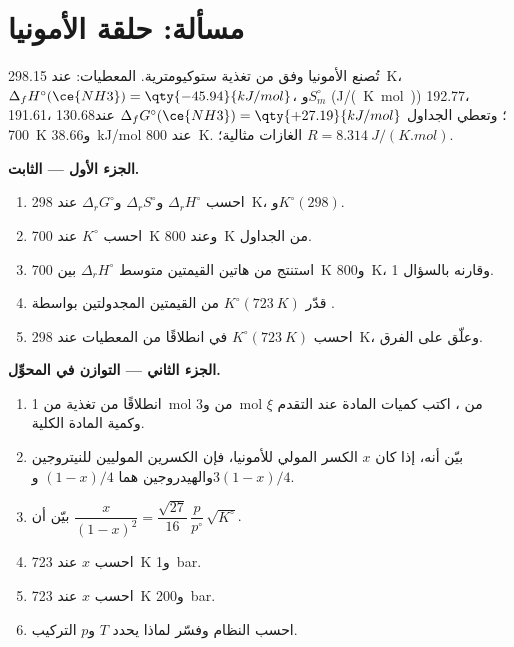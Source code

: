 \section{مسألة: حلقة الأمونيا}

\begin{problem}
\label{pb:b2:equilibrium-shifts:1}
تُصنع الأمونيا وفق  من تغذية ستوكيومترية.
المعطيات: عند \qty{298.15}{K}، $\Delta_f H^\circ(\ce{NH3}) = \qty{-45.94}{kJ/mol}$،
و$S^\circ_m$ (\unit{J/(K.mol)})  192.77،  191.61،  130.68؛
وتعطي الجداول $\Delta_f G^\circ(\ce{NH3}) = \qty{+27.19}{kJ/mol}$ عند
\qty{700}{K} و\qty{+38.66}{kJ/mol} عند \qty{800}{K}. الغازات مثالية؛
$R = \qty{8.314}{J/(K.mol)}$.

\medskip
\noindent\textbf{الجزء الأول --- الثابت.}
\begin{enumerate}
  \item احسب $\Delta_r H^\circ$ و$\Delta_r S^\circ$ و$\Delta_r G^\circ$ عند
        \qty{298}{K}، و$K^\circ(298)$.
  \item احسب $K^\circ$ عند \qty{700}{K} وعند \qty{800}{K} من الجداول.
  \item استنتج من هاتين القيمتين متوسط $\Delta_r H^\circ$ بين
        \qty{700}{K} و\qty{800}{K}، وقارنه بالسؤال 1.
  \item قدّر $K^\circ(\qty{723}{K})$ من القيمتين المجدولتين بواسطة
        .
  \item احسب $K^\circ(\qty{723}{K})$ في  انطلاقًا من
        المعطيات عند \qty{298}{K}، وعلّق على الفرق.
\end{enumerate}

\medskip
\noindent\textbf{الجزء الثاني --- التوازن في المحوِّل.}
\begin{enumerate}[resume]
  \item انطلاقًا من تغذية من \qty{1}{mol} من  و\qty{3}{mol} من ، اكتب
        كميات المادة عند التقدم $\xi$ وكمية المادة الكلية.
  \item بيّن أنه، إذا كان $x$ الكسر المولي للأمونيا، فإن الكسرين الموليين
        للنيتروجين  والهيدروجين  هما $(1-x)/4$ و$3(1-x)/4$.
  \item بيّن أن $\dfrac{x}{(1-x)^2} = \dfrac{\sqrt{27}}{16}\,\dfrac{p}{p^\circ}\,
        \sqrt{K^\circ}$.
  \item احسب $x$ عند \qty{723}{K} و\qty{1}{bar}.
  \item احسب $x$ عند \qty{723}{K} و\qty{200}{bar}.
  \item احسب  النظام وفسّر لماذا يحدد $T$ و$p$
        التركيب.
\end{enumerate}


\end{problem}

